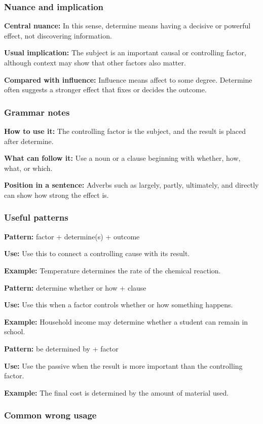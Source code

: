 \documentclass[11pt]{article}
\begin{document}
\subsubsection{Nuance and implication}
\textbf{Central nuance:} In this sense, determine means having a decisive or powerful effect, not discovering information.

\textbf{Usual implication:} The subject is an important causal or controlling factor, although context may show that other factors also matter.

\textbf{Compared with influence:} Influence means affect to some degree. Determine often suggests a stronger effect that fixes or decides the outcome.

\subsubsection{Grammar notes}
\textbf{How to use it:} The controlling factor is the subject, and the result is placed after determine.

\textbf{What can follow it:} Use a noun or a clause beginning with whether, how, what, or which.

\textbf{Position in a sentence:} Adverbs such as largely, partly, ultimately, and directly can show how strong the effect is.

\subsubsection{Useful patterns}
\textbf{Pattern:} factor + determine(s) + outcome

\textbf{Use:} Use this to connect a controlling cause with its result.

\textbf{Example:} Temperature determines the rate of the chemical reaction.

\textbf{Pattern:} determine whether or how + clause

\textbf{Use:} Use this when a factor controls whether or how something happens.

\textbf{Example:} Household income may determine whether a student can remain in school.

\textbf{Pattern:} be determined by + factor

\textbf{Use:} Use the passive when the result is more important than the controlling factor.

\textbf{Example:} The final cost is determined by the amount of material used.

\subsubsection{Common wrong usage}
\end{document}
